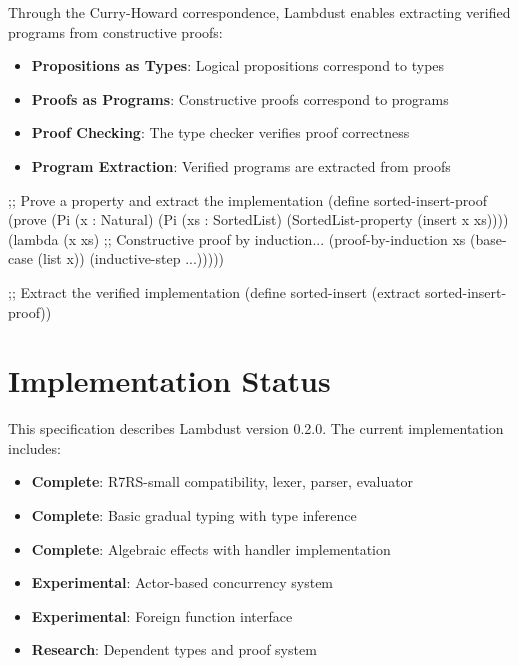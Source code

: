 Through the Curry-Howard correspondence, Lambdust enables extracting verified programs from constructive proofs:

\begin{itemize}
\item \textbf{Propositions as Types}: Logical propositions correspond to types
\item \textbf{Proofs as Programs}: Constructive proofs correspond to programs
\item \textbf{Proof Checking}: The type checker verifies proof correctness
\item \textbf{Program Extraction}: Verified programs are extracted from proofs
\end{itemize}

\begin{example}
\begin{lambdustcode}
;; Prove a property and extract the implementation
(define sorted-insert-proof
  (prove (Pi (x : Natural) (Pi (xs : SortedList) 
           (SortedList-property (insert x xs))))
    (lambda (x xs)
      ;; Constructive proof by induction...
      (proof-by-induction xs
        (base-case (list x))
        (inductive-step ...)))))

;; Extract the verified implementation
(define sorted-insert (extract sorted-insert-proof))
\end{lambdustcode}
\end{example}

\section{Implementation Status}
\label{subsec:status}

This specification describes Lambdust version 0.2.0. The current implementation includes:

\begin{itemize}
\item \textbf{Complete}: R7RS-small compatibility, lexer, parser, evaluator
\item \textbf{Complete}: Basic gradual typing with type inference
\item \textbf{Complete}: Algebraic effects with handler implementation
\item \textbf{Experimental}: Actor-based concurrency system
\item \textbf{Experimental}: Foreign function interface
\item \textbf{Research}: Dependent types and proof system
\end{itemize}

